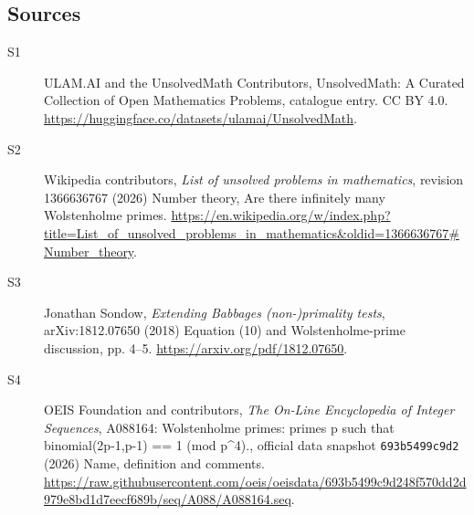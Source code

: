 \documentclass[11pt]{article}
\begin{document}
\subsection{Sources}
\begin{description}
\item[\hypertarget{source:statement:1}{S1}] ULAM.AI and the UnsolvedMath Contributors, UnsolvedMath: A Curated Collection of Open Mathematics Problems, catalogue entry. CC BY 4.0. \url{https://huggingface.co/datasets/ulamai/UnsolvedMath}.
\item[\hypertarget{source:statement:2}{S2}] Wikipedia contributors, \emph{List of unsolved problems in mathematics}, revision 1366636767 (2026) Number theory, Are there infinitely many Wolstenholme primes. \url{https://en.wikipedia.org/w/index.php?title=List_of_unsolved_problems_in_mathematics&oldid=1366636767#Number_theory}.
\item[\hypertarget{source:statement:3}{S3}] Jonathan Sondow, \emph{Extending Babbage\textquotesingle s (non-)primality tests}, arXiv:1812.07650 (2018) Equation (10) and Wolstenholme-prime discussion, pp. 4--5. \url{https://arxiv.org/pdf/1812.07650}.
\item[\hypertarget{source:statement:4}{S4}] OEIS Foundation and contributors, \emph{The On-Line Encyclopedia of Integer Sequences}, A088164: Wolstenholme primes: primes p such that binomial(2p-1,p-1) == 1 (mod p\textasciicircum{}4)., official data snapshot \texttt{693b5499c9d2} (2026) Name, definition and comments. \url{https://raw.githubusercontent.com/oeis/oeisdata/693b5499c9d248f570dd2d979e8bd1d7eecf689b/seq/A088/A088164.seq}.
\end{description}
\label{end:statement}
\end{document}
